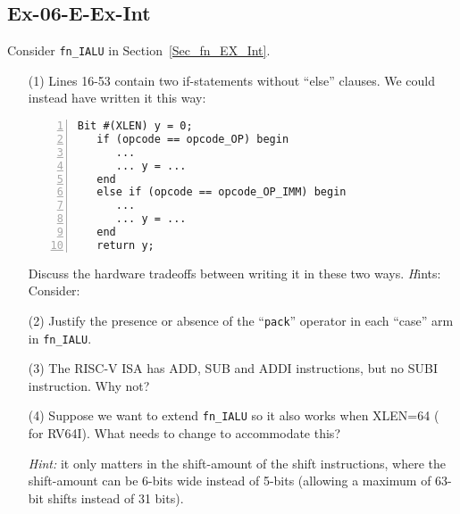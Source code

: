 
\subsection*{Ex-06-E-Ex-Int}
\label{Ex-06-E-Ex-Int}

Consider {\tt fn\_IALU} in Section~\ref{Sec_fn_EX_Int}.

\begin{itemize}

\item[(1)] Lines 16-53 contain two if-statements without ``else''
    clauses.  We could instead have written it this way:

    {\footnotesize
    \begin{Verbatim}[frame=single, numbers=left]
   Bit #(XLEN) y = 0;
   if (opcode == opcode_OP) begin
      ...
      ... y = ...
   end
   else if (opcode == opcode_OP_IMM) begin
      ...
      ... y = ...
   end
   return y;
    \end{Verbatim}
    }

    Discuss the hardware tradeoffs between writing it in these two
    ways.  {\emph Hints:} Consider:


\item[(2)] Justify the presence or absence of the ``{\tt pack}''
    operator in each ``case'' arm in {\tt fn\_IALU}.

\item[(3)] The RISC-V ISA has ADD, SUB and ADDI instructions, but no
    SUBI instruction.  Why not?

\item[(4)] Suppose we want to extend {\tt fn\_IALU} so it also works
    when XLEN=64 ({\ie} for RV64I).  What needs to change to
    accommodate this?

    \emph{Hint:} it only matters in the shift-amount of the shift
    instructions, where the shift-amount can be 6-bits wide instead of
    5-bits (allowing a maximum of 63-bit shifts instead of 31 bits).

\end{itemize}

